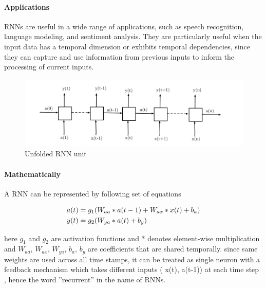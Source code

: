 \documentclass{article}
\begin{document}
\paragraph{Applications} RNNs are useful in a wide range of applications, such as speech recognition, language modeling, and sentiment analysis. They are particularly useful when the input data has a temporal dimension or exhibits temporal dependencies, since they can capture and use information from previous inputs to inform the processing of current inputs.

\vspace{1em}
\begin{figure}[h]
	\centering
	\includegraphics[scale=0.8]{images/rnn_unfolded}
	\caption{Unfolded RNN unit}
\end{figure}

\paragraph{Mathematically } A RNN can be represented by following set of equations 
\begin{center}
\begin{tcolorbox}[colframe=orange,boxsep=5pt,boxrule=1pt,colback=white, width=0.6\linewidth]
\begin{equation*}
	\begin{aligned}
		\centering
		&a(t) = g_1 ( W_{aa} * a(t-1) + W_{ax} * x(t) + b_a)\\
		&y(t) = g_2 ( W_{ya} * a(t) + b_y )
	\end{aligned}
\end{equation*}
\end{tcolorbox}
\end{center}

\hspace{1em} here $g_1$ and $g_2$ are activation functions and * denotes element-wise multiplication and $W_{aa}$, $W_{ax}$, $W_{ya}$, $b_a$, $b_y$ are coefficients that are shared temporally. since same weights are used across all time stamps, it can be treated as single neuron with a feedback mechanism which takes different inputs ( x(t), a(t-1)) at each time step , hence the word ”recurrent” in the name of RNNs.
\end{document}
